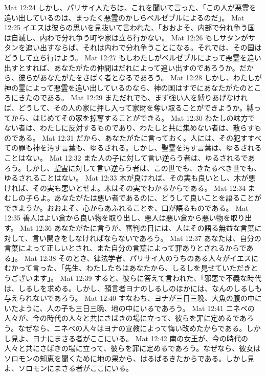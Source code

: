 Mat 12:24  しかし、パリサイ人たちは、これを聞いて言った、「この人が悪霊を追い出しているのは、まったく悪霊のかしらベルゼブルによるのだ」。
Mat 12:25  イエスは彼らの思いを見抜いて言われた、「おおよそ、内部で分れ争う国は自滅し、内わで分れ争う町や家は立ち行かない。
Mat 12:26  もしサタンがサタンを追い出すならば、それは内わで分れ争うことになる。それでは、その国はどうして立ち行けよう。
Mat 12:27  もしわたしがベルゼブルによって悪霊を追い出すとすれば、あなたがたの仲間はだれによって追い出すのであろうか。だから、彼らがあなたがたをさばく者となるであろう。
Mat 12:28  しかし、わたしが神の霊によって悪霊を追い出しているのなら、神の国はすでにあなたがたのところにきたのである。
Mat 12:29  まただれでも、まず強い人を縛りあげなければ、どうして、その人の家に押し入って家財を奪い取ることができようか。縛ってから、はじめてその家を掠奪することができる。
Mat 12:30  わたしの味方でない者は、わたしに反対するものであり、わたしと共に集めない者は、散らすものである。
Mat 12:31  だから、あなたがたに言っておく。人には、その犯すすべての罪も神を汚す言葉も、ゆるされる。しかし、聖霊を汚す言葉は、ゆるされることはない。
Mat 12:32  また人の子に対して言い逆らう者は、ゆるされるであろう。しかし、聖霊に対して言い逆らう者は、この世でも、きたるべき世でも、ゆるされることはない。
Mat 12:33  木が良ければ、その実も良いとし、木が悪ければ、その実も悪いとせよ。木はその実でわかるからである。
Mat 12:34  まむしの子らよ。あなたがたは悪い者であるのに、どうして良いことを語ることができようか。おおよそ、心からあふれることを、口が語るものである。
Mat 12:35  善人はよい倉から良い物を取り出し、悪人は悪い倉から悪い物を取り出す。
Mat 12:36  あなたがたに言うが、審判の日には、人はその語る無益な言葉に対して、言い開きをしなければならないであろう。
Mat 12:37  あなたは、自分の言葉によって正しいとされ、また自分の言葉によって罪ありとされるからである」。
Mat 12:38  そのとき、律法学者、パリサイ人のうちのある人々がイエスにむかって言った、「先生、わたしたちはあなたから、しるしを見せていただきとうございます」。
Mat 12:39  すると、彼らに答えて言われた、「邪悪で不義な時代は、しるしを求める。しかし、預言者ヨナのしるしのほかには、なんのしるしも与えられないであろう。
Mat 12:40  すなわち、ヨナが三日三晩、大魚の腹の中にいたように、人の子も三日三晩、地の中にいるであろう。
Mat 12:41  ニネベの人々が、今の時代の人々と共にさばきの場に立って、彼らを罪に定めるであろう。なぜなら、ニネベの人々はヨナの宣教によって悔い改めたからである。しかし見よ、ヨナにまさる者がここにいる。
Mat 12:42  南の女王が、今の時代の人々と共にさばきの場に立って、彼らを罪に定めるであろう。なぜなら、彼女はソロモンの知恵を聞くために地の果から、はるばるきたからである。しかし見よ、ソロモンにまさる者がここにいる。
